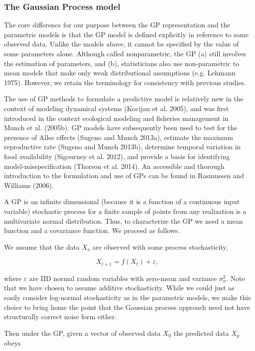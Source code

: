 \documentclass[author-year, 12pt,review]{components/elsarticle} %
\begin{document}
\subsubsection{The Gaussian Process
model}\label{the-gaussian-process-model}

The core difference for our purpose between the GP representation and
the parametric models is that the GP model is defined explicitly in
reference to some observed data. Unlike the models above, it cannot be
specified by the value of some parameters alone. Although called
nonparametric, the GP (a) still involves the estimation of parameters,
and (b), statisticians also use non-parametric to mean models that make
only weak distributional assumptions (e.g. Lehmann 1975). However, we
retain the terminology for consistency with previous studies.

The use of GP methods to formulate a predictive model is relatively new
in the context of modeling dynamical systems (Kocijan et al. 2005), and
was first introduced in the context ecological modeling and fisheries
management in Munch et al. (2005b). GP models have subsequently been
used to test for the presence of Allee effects (Sugeno and Munch 2013a),
estimate the maximum reproductive rate (Sugeno and Munch 2013b),
determine temporal variation in food availability (Sigourney et al.
2012), and provide a basis for identifying model-misspecification
(Thorson et al. 2014). An accessible and thorough introduction to the
formulation and use of GPs can be found in Rasmussen and Williams
(2006).

A GP is an infinite dimensional (because it is a function of a
continuous input variable) stochastic process for a finite sample of
points from any realization is a multivariate normal distribution. Thus,
to characterize the GP we need a mean function and a covariance
function. We proceed as follows.

We assume that the data $X_o$ are observed with some process
stochasticity,

\[X_{t+1} = f(X_t) + \varepsilon,\]

where $\varepsilon$ are IID normal random variables with zero-mean and
variance $\sigma_n^2$. Note that we have chosen to assume additive
stochasticity. While we could just as easily consider log-normal
stochasticity as in the parametric models, we make this choice to bring
home the point that the Gaussian process approach need not have
structurally correct noise form either.

Then under the GP, given a vector of observed data $X_0$ the predicted
data $X_p$ obeys
\end{document}
